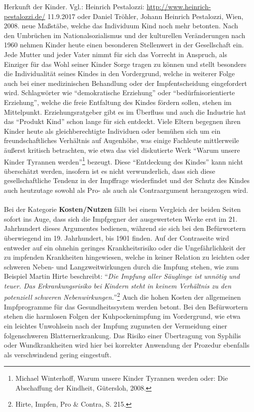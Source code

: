\documentclass[
    a4paper,
    12pt,
    hyphens,
    chapterprefix=true,
    headheight=33pt,
    footheight=29pt,
    headings=optiontohead,
]{scrartcl}
\begin{document}
{{Herkunft der Kinder. Vgl.: Heinrich Pestalozzi: \url{http://www.heinrich-pestalozzi.de/} 11.9.2017 oder Daniel Tröhler, Johann Heinrich
Pestalozzi, Wien, 2008.}
 neue Maßstäbe, welche das Individuum Kind noch mehr betonten. Nach den Umbrüchen im Nationalsozialismus und der kulturellen Veränderungen nach 1960 nehmen Kinder heute einen besonderen Stellenwert in der Gesellschaft ein. Jede Mutter und jeder Vater nimmt für sich das Vorrecht in Anspruch, als Einziger für das Wohl seiner Kinder Sorge tragen zu können und stellt besonders die Individualität seines Kindes in den Vordergrund, welche in weiterer Folge auch bei einer medizinischen Behandlung oder der Impfentscheidung eingefordert wird. Schlagwörter wie "`demokratische Erziehung"' oder "`bedürfnisorientierte Erziehung"', welche die freie Entfaltung des Kindes fördern sollen, stehen im Mittelpunkt. Erziehungsratgeber gibt es im Überfluss und auch die Industrie hat das "`Produkt Kind"' schon lange für sich entdeckt. Viele Eltern begegnen ihren Kinder heute als gleichberechtigte Individuen oder bemühen sich um ein freundschaftliches Verhältnis auf Augenhöhe, was einige Fachleute mittlerweile äußerst kritisch betrachten, wie etwa das viel diskutierte Werk "`Warum unsere Kinder Tyrannen werden"'\footnote{Michael Winterhoff, Warum unsere Kinder Tyrannen werden oder: Die Abschaffung der Kindheit, Gütersloh, 2008.} bezeugt. Diese "`Entdeckung des Kindes"' kann nicht überschätzt werden, insofern ist es nicht verwunderlich, dass sich diese gesellschaftliche Tendenz in der Impffrage wiederfindet und der Schutz des Kindes auch heutzutage sowohl als Pro- als auch als Contraargument herangezogen wird.\\
\\
Bei der Kategorie \textbf{Kosten/Nutzen} fällt bei einem Vergleich der beiden Seiten sofort ins Auge, dass sich die Impfgegner der ausgewerteten Werke erst im 21. Jahrhundert dieses Argumentes bedienen, während sie sich bei den Befürwortern überwiegend im 19. Jahrhundert, bis 1901 finden. Auf der Contraseite wird entweder auf ein ohnehin geringes Krankheitsrisiko oder die Ungefährlichkeit der zu impfenden Krankheiten hingewiesen, welche in keiner Relation zu leichten oder schweren Neben- und Langzweitwirkungen durch die Impfung stehen, wie zum Beispiel Martin Hirte beschreibt: "`\textit{Die Impfung aller Säuglinge ist unnötig und teuer. Das Erkrankungsrisiko bei Kindern steht in keinem Verhältnis zu den potenziell schweren Nebenwirkungen.}"'\footnote{Hirte, Impfen, Pro \& Contra, S. 215.}
 Auch die hohen Kosten der allgemeinen Impfprogramme für das Gesundheitssystem werden betont. Bei den Befürwortern stehen die harmlosen Folgen der Kuhpockenimpfung im Vordergrund, wie etwa ein leichtes Unwohlsein nach der Impfung zugunsten der Vermeidung einer folgenschweren Blatternerkrankung. Das Risiko einer Übertragung von Syphilis oder Wundkrankheiten wird hier bei korrekter Anwendung der Prozedur ebenfalls als verschwindend gering eingestuft.
}
\end{document}
